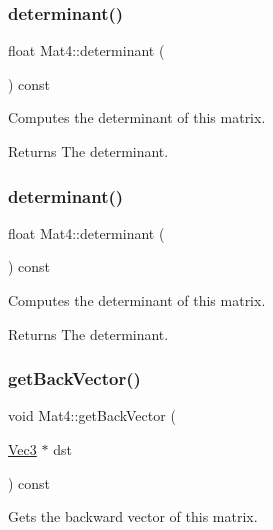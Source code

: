 \subsubsection{\texorpdfstring{determinant()}{determinant()}\hspace{0.1cm}{\footnotesize\ttfamily [1/2]}}
{\footnotesize\ttfamily float Mat4\+::determinant (\begin{DoxyParamCaption}{ }\end{DoxyParamCaption}) const}

Computes the determinant of this matrix.

\begin{DoxyReturn}{Returns}
The determinant. 
\end{DoxyReturn}
\mbox{\label{classMat4_aba33e196546ec0ed036c7fe690c072ac}} 
\subsubsection{\texorpdfstring{determinant()}{determinant()}\hspace{0.1cm}{\footnotesize\ttfamily [2/2]}}
{\footnotesize\ttfamily float Mat4\+::determinant (\begin{DoxyParamCaption}{ }\end{DoxyParamCaption}) const}

Computes the determinant of this matrix.

\begin{DoxyReturn}{Returns}
The determinant. 
\end{DoxyReturn}
\mbox{\label{classMat4_aa1f197b8d1e34ebf41bf7c222119b11b}} 
\subsubsection{\texorpdfstring{get\+Back\+Vector()}{getBackVector()}\hspace{0.1cm}{\footnotesize\ttfamily [1/2]}}
{\footnotesize\ttfamily void Mat4\+::get\+Back\+Vector (\begin{DoxyParamCaption}\item[{\hyperlink{classVec3}{Vec3} $\ast$}]{dst }\end{DoxyParamCaption}) const}

Gets the backward vector of this matrix.


